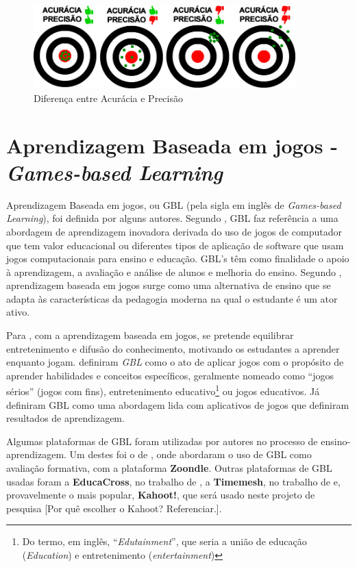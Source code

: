 \begin{figure}
    \centering
    \includegraphics[width=0.9\textwidth]{modelo-monografia-rej-2018/img/PrecisaoAcuracia.jpg}
    
    \caption{Diferença entre Acurácia e Precisão}
    \label{fig:PrecAcur}
\end{figure}

\section{Aprendizagem Baseada em jogos - \textit{Games-based Learning}}
\label{sec:GBL}

Aprendizagem Baseada em jogos, ou GBL (pela sigla em inglês de \textit{Games-based Learning}), foi definida por alguns autores. Segundo , GBL faz referência a uma abordagem de aprendizagem inovadora derivada do uso de jogos de computador que tem valor educacional ou diferentes tipos de aplicação de software que usam jogos computacionais para ensino e educação. GBL's têm como finalidade o apoio à aprendizagem, a avaliação e análise de alunos e melhoria do ensino. Segundo , aprendizagem baseada em jogos surge como uma alternativa de ensino que se adapta às características da pedagogia moderna na qual o estudante é um ator ativo.

Para , com a aprendizagem baseada em jogos, se pretende equilibrar entretenimento e difusão do conhecimento, motivando os estudantes a aprender enquanto jogam.  definiram \textit{GBL} como o ato de aplicar jogos com o propósito de aprender habilidades e conceitos específicos, geralmente nomeado como “jogos sérios” (jogos com fins), entretenimento educativo\footnote{Do termo, em inglês, “\textit{Edutainment}”, que seria a união de educação (\textit{Education}) e entretenimento (\textit{entertainment})} ou jogos educativos. Já  definiram GBL como uma abordagem lida com aplicativos de jogos que definiram resultados de aprendizagem.

Algumas plataformas de GBL foram utilizadas por autores no processo de ensino-aprendizagem. Um destes foi o de , onde abordaram o uso de GBL como avaliação formativa, com a plataforma \textbf{Zoondle}. Outras plataformas de GBL usadas foram a \textbf{EducaCross}, no trabalho de , a \textbf{Timemesh}, no trabalho de  e, provavelmente o mais popular, \textbf{Kahoot!}, que será usado neste projeto de pesquisa {\color{red}[Por quê escolher o Kahoot? Referenciar.]}.

